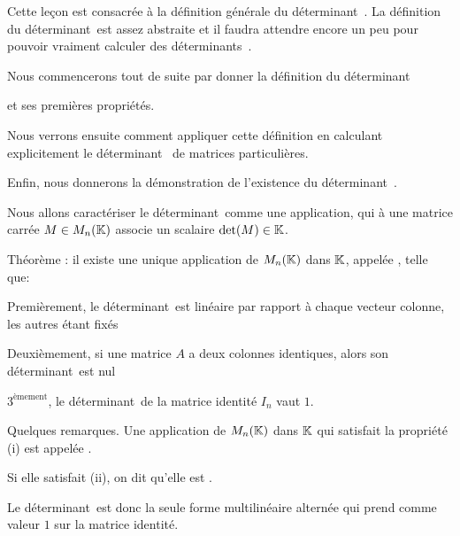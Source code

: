 



\newcommand{\deter}{déter\-mi\-nant\ }
\newcommand{\deters}{déter\-mi\-nants\ }



\debuttexte


\diapo

\change

Cette leçon est consacrée à la définition générale du \deter.
La définition du \deter est assez abstraite et il faudra attendre encore un peu pour pouvoir vraiment calculer des \deters.

\change
Nous commencerons tout de suite par donner la définition du \deter

\change
et ses premières propriétés.

\change
Nous verrons ensuite comment appliquer cette définition en calculant explicitement le \deter
de matrices particulières.

\change
Enfin, nous donnerons la démonstration de l'existence du \deter.

\diapo
Nous allons caractériser le \deter comme une application, 
qui à une matrice carrée $M \in M_n(\mathbb{K})$ associe un scalaire 
$\det(M) \in \mathbb{K}$.

\change
Théorème : il existe une unique application de $M_n(\mathbb{K})$ dans $\mathbb{K}$, 
appelée \defi{\deter}, telle que:

\change
Premièrement, le \deter est linéaire par rapport à chaque
vecteur colonne, les autres étant fixés

\change
Deuxièmement, si une matrice $A$ a deux colonnes identiques, 
alors son \deter est nul

\change
$3^\text{èmement}$, le \deter de la matrice identité $I_n$ vaut $1$.

\change
Quelques remarques. Une application de $M_n(\mathbb{K})$ dans $\mathbb{K}$ qui satisfait la propriété
(i) est appelée . 

\change
Si elle satisfait (ii), on dit qu'elle est .

Le \deter est donc la seule forme multilinéaire alternée qui prend 
comme valeur $1$ sur la matrice identité. 

